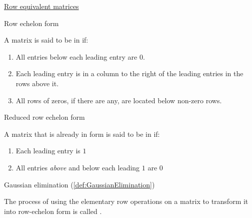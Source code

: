 \documentclass{ximera}
\begin{document}
\href{https://ximera.osu.edu/oerlinalg/LinearAlgebra/SYS-0020/main}{Row equivalent matrices}

\begin{center}
\end{center}

Row echelon form
\begin{expandable}
    A matrix is said to be in  if:
\begin{enumerate}
\item All entries below each leading entry are 0.
\item Each leading entry is in a column to the right of the leading entries in the rows above it.
\item All rows of zeros, if there are any, are located below non-zero rows.
\end{enumerate}
\end{expandable}

\begin{center}
\end{center}

Reduced row echelon form
\begin{expandable}
    A matrix that is already in  form is said to be in  if:
\begin{enumerate}
\item Each leading entry is $1$
\item All entries {\it above} and below each leading $1$ are $0$
\end{enumerate}
\end{expandable}

\begin{center}
\end{center}

Gaussian elimination (\ref{def:GaussianElimination})
\begin{expandable}
    The process of using the elementary row operations on a matrix to transform it into row-echelon form is called .
\end{expandable}
\end{document}
